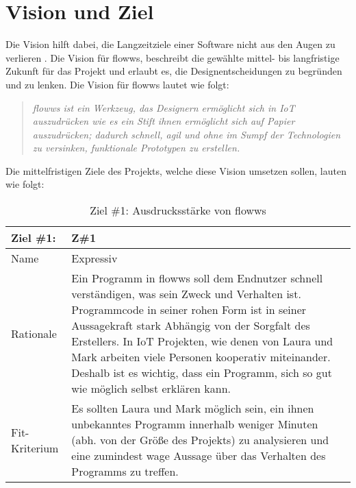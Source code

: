 \section{Vision und Ziel}
Die Vision hilft dabei, die Langzeitziele einer Software nicht aus den Augen zu verlieren \cite{wiegers2013software}. Die Vision für flowws, beschreibt die gewählte mittel- bis langfristige Zukunft für das Projekt und erlaubt es, die Designentscheidungen zu begründen und zu lenken. Die Vision für flowws lautet wie folgt:
\begin{quote}
    \textit{flowws ist ein Werkzeug, das Designern ermöglicht sich in \ac{IoT} auszudrücken wie es ein Stift ihnen ermöglicht sich auf Papier auszudrücken; dadurch schnell, agil und ohne im Sumpf der Technologien zu versinken, funktionale Prototypen zu erstellen.}
\end{quote}

Die mittelfristigen Ziele des Projekts, welche diese Vision umsetzen sollen, lauten wie folgt: 

\begin{table}[H]
\caption{Ziel \#1: Ausdrucksstärke von flowws}
\label{tab:ziel3}
\begin{tabularx}{\textwidth}{lX}
\hline
\rowcolor[HTML]{EFEFEF} 
Ziel \#1:     & Z\#1 \\ \hline
Name          & Expressiv \\ \hline
Rationale     & Ein Programm in flowws soll dem Endnutzer schnell verständigen, was sein Zweck und Verhalten ist. Programmcode in seiner rohen Form ist in seiner Aussagekraft stark Abhängig von der Sorgfalt des Erstellers. In IoT Projekten, wie denen von Laura und Mark arbeiten viele Personen kooperativ miteinander. Deshalb ist es wichtig, dass ein Programm, sich so gut wie möglich selbst erklären kann. \\ \hline
Fit-Kriterium & Es sollten Laura und Mark möglich sein, ein ihnen unbekanntes Programm innerhalb weniger Minuten (abh. von der Größe des Projekts) zu analysieren und eine zumindest wage Aussage über das Verhalten des Programms zu treffen. \\ \hline
\end{tabularx}
\end{table}

